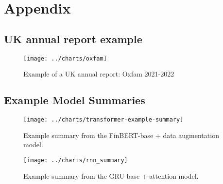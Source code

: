 \section{Appendix}
\subsection{UK annual report example}
\begin{figure}[ht]
    \centering
    \texttt{[image: ../charts/oxfam]}
    \caption{Example of a UK annual report: Oxfam 2021-2022}\label{fig:annual_report_example}
\end{figure}

\subsection{Example Model Summaries}
\begin{figure}[ht]
    \centering
    \texttt{[image: ../charts/transformer-example-summary]}
    \caption{Example summary from the FinBERT-base + data augmentation model.}
    \label{fig:finbert_summary}
\end{figure}

\begin{figure}[ht]
        \centering
        \texttt{[image: ../charts/rnn\_summary]}
        \caption{Example summary from the GRU-base + attention model.}
        \label{fig:rnn_summary}
\end{figure}